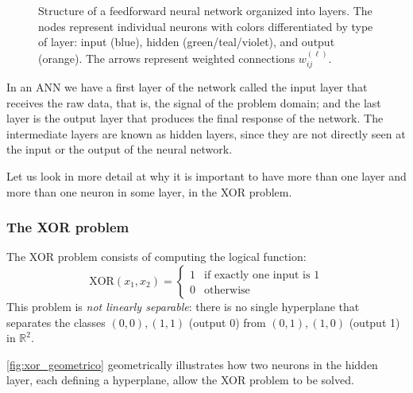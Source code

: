 \begin{figure}[h]
\caption[Structure of a layered neural network]{Structure of a feedforward neural network organized into layers. The nodes represent individual neurons with colors differentiated by type of layer: input (blue), hidden (green/teal/violet), and output (orange). The arrows represent weighted connections $w_{ij}^{(\ell)}$.}
\label{fig:neural_network}
\end{figure}

In an \gls{ANN} we have a first layer of the network called the input layer that receives the raw data, that is, the signal of the problem domain; and the last layer is the output layer that produces the final response of the network. The intermediate layers are known as hidden layers, since they are not directly seen at the input or the output of the neural network.

Let us look in more detail at why it is important to have more than one layer and more than one neuron in some layer, in the XOR problem.

\subsubsection{The XOR problem}

The XOR problem consists of computing the logical function:
\[
\text{XOR}(x_1, x_2) = \begin{cases}
1 & \text{if exactly one input is 1} \\
0 & \text{otherwise}
\end{cases}
\]
This problem is \textit{not linearly separable}: there is no single hyperplane that separates the classes $(0,0), (1,1)$ (output 0) from $(0,1), (1,0)$ (output 1) in $\mathbb{R}^2$.

\autoref{fig:xor_geometrico} geometrically illustrates how two neurons in the hidden layer, each defining a hyperplane, allow the XOR problem to be solved.


